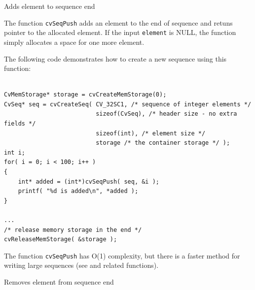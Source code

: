 \label{SeqPush}

Adds element to sequence end


\begin{description}
\end{description}


The function \texttt{cvSeqPush} adds an element to the end of sequence and retuns pointer to the allocated element. If the input \texttt{element} is NULL, the function simply allocates a space for one more element.

The following code demonstrates how to create a new sequence using this function:

\begin{lstlisting}

CvMemStorage* storage = cvCreateMemStorage(0);
CvSeq* seq = cvCreateSeq( CV_32SC1, /* sequence of integer elements */
                          sizeof(CvSeq), /* header size - no extra fields */
                          sizeof(int), /* element size */
                          storage /* the container storage */ );
int i;
for( i = 0; i < 100; i++ )
{
    int* added = (int*)cvSeqPush( seq, &i );
    printf( "%d is added\n", *added );
}

...
/* release memory storage in the end */
cvReleaseMemStorage( &storage );

\end{lstlisting}

The function \texttt{cvSeqPush} has O(1) complexity, but there is a faster method for writing large sequences (see  and related functions).


\label{SeqPop}

Removes element from sequence end


\begin{description}
\end{description}

